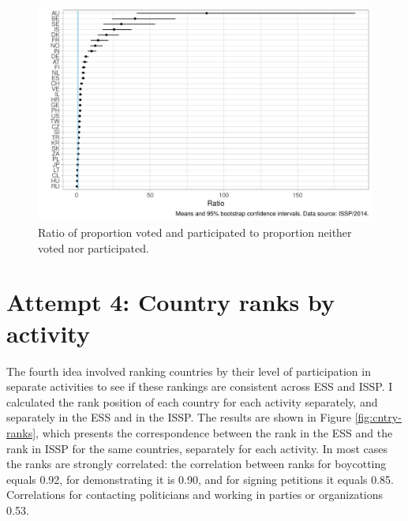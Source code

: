\documentclass[12pt,]{article}
\begin{document}
\begin{figure}[H]

{\centering \includegraphics{report_files/figure-latex/issp-ratio-all-1} 

}

\caption{Ratio of proportion voted and participated to proportion neither voted nor participated.}\label{fig:issp-ratio-all}
\end{figure}

\hypertarget{attempt-4-country-ranks-by-activity}{%
\section{Attempt 4: Country ranks by activity}\label{attempt-4-country-ranks-by-activity}}

The fourth idea involved ranking countries by their level of participation in separate activities to see if these rankings are consistent across ESS and ISSP. I calculated the rank position of each country for each activity separately, and separately in the ESS and in the ISSP. The results are shown in Figure \ref{fig:cntry-ranks}, which presents the correspondence between the rank in the ESS and the rank in ISSP for the same countries, separately for each activity. In most cases the ranks are strongly correlated: the correlation between ranks for boycotting equals 0.92, for demonstrating it is 0.90, and for signing petitions it equals 0.85. Correlations for contacting politicians and working in parties or organizations 0.53.
\end{document}

